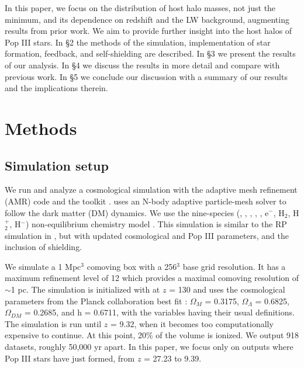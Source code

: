 \documentclass[a4paper,fleqn,usenatbib]{mnras}
\begin{document}
In this paper, we focus on the distribution of host halo masses, not just the minimum, and its dependence on redshift and the LW background, augmenting results from prior work. We aim to provide further insight into the host halos of Pop III stars. In \S 2 the methods of the simulation, implementation of star formation, feedback, and \hh{} self-shielding are described. In \S 3 we present the results of our analysis. In \S 4 we discuss the results in more detail and compare with previous work. In \S 5 we conclude our discussion with a summary of our results and the implications therein.

\section{Methods}
\subsection{Simulation setup}
We run and analyze a cosmological simulation with the adaptive mesh refinement (AMR) code \enzo{} \citep{Enzo} and the toolkit \yt{} \citep{yt_full_paper}. \enzo{} uses an N-body adaptive particle-mesh solver \citep{Efstathiou85, Couchman91, BryanNorman1997} to follow the dark matter (DM) dynamics. We use the nine-species (\hi, \hii, \hei, \heii, \heiii, e$^{-}$, H$_{2}$, H$_{2}^{+}$, H$^{-}$) non-equilibrium chemistry model \citep{Abel97, Anninos97}. This simulation is similar to the RP simulation in \citet[hereafter W12]{Wise12_RP}, but with updated cosmological and Pop III parameters, and the inclusion of \hh{} shielding.

We simulate a 1 Mpc$^{3}$ comoving box with a 256$^{3}$ base grid 
resolution. It has a maximum refinement level of 12 which provides a maximal comoving resolution of $\sim$1 pc. The simulation is 
initialized with \music{} \citep{Hahn11_MUSIC} at $z$ = 130 and uses the cosmological parameters from the Planck collaboration best fit 
\citet{Planck13_Cosmo}: $\Omega_{M}$ = 0.3175, $\Omega_{\Lambda}$ = 
0.6825, $\Omega_{DM}$ = 0.2685, and h = 0.6711, with the variables 
having their usual definitions. The simulation is run until $z$ = 9.32, when it becomes too computationally expensive to continue. At this point, 20\% of the volume is ionized. We output 918 datasets,  roughly 50,000 yr apart. In this paper, we focus only on outputs where Pop III stars have just formed, from $z$ = 27.23 to 9.39. 
\end{document}
